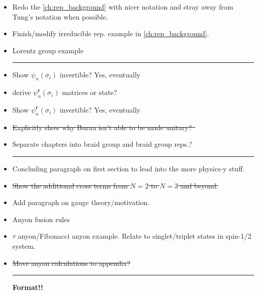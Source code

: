 \begin{itemize}
    
    \item Redo the \cref{ch:rep_background} with nicer notation and stray away from Tung's notation when possible.
    \item Finish/modify irreducible rep. example in \cref{ch:rep_background}.
    \item Lorentz group example
    
    \begin{center}\rule{.85\textwidth}{0.65pt}\end{center}
    
    \item Show $\psi_n(\sigma_i)$ invertible? Yes, eventually
    \item derive $\psi_n^\textbf{r}(\sigma_i)$ matrices or state?
    \item Show $\psi_n^\textbf{r}(\sigma_i)$ invertible? Yes, eventually
    \item \sout{Explicitly show why Burau isn't able to be made unitary?~\cite{Delaney2016}}
    \item Separate chapters into braid group and braid group reps.?
    
    \begin{center}\rule{.85\textwidth}{0.65pt}\end{center}
    
    \item Concluding paragraph on first section to lead into the more physics-y stuff.
    \item \sout{Show the additional cross terms from $N=2$ to $N=3$ and beyond.}
    \item Add paragraph on gauge theory/motivation.
    \item Anyon fusion rules
    \item $\tau$ anyon/Fibonacci anyon example. Relate to singlet/triplet states in spin-1/2 system.
    \item \sout{Move anyon calculations to appendix?}
    
    \begin{center}\rule{.85\textwidth}{0.65pt}\end{center}
    
    \textbf{Format!!}
\end{itemize}
